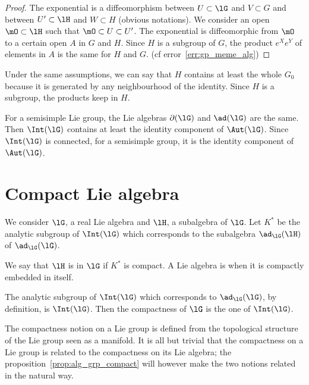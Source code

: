 \begin{proof}
The exponential is a diffeomorphism between $U\subset\lG$ and $V\subset G$ and between $U'\subset\lH$ and $W\subset H$ (obvious notations). We consider an open $\mO\subset\lH$ such that $\mO\subset U\subset U'$. The exponential is diffeomorphic from $\mO$ to a certain open $A$ in $G$ and $H$. Since $H$ is a subgroup of $G$, the product $e^Xe^Y$ of elements in $A$ is the same for $H$ and $G$. (cf error~\ref{err:gp_meme_alg})
\end{proof}

Under the same assumptions, we can say that $H$ contains at least the whole $G_0$ because it is generated by any neighbourhood of the identity. Since $H$ is a subgroup, the products keep in $H$.

For a semisimple Lie group, the Lie algebras $\partial(\lG)$ and $\ad(\lG)$ are the same. Then $\Int(\lG)$ contains at least the identity component of $\Aut(\lG)$. Since $\Int(\lG)$ is connected, for a semisimple group, it is the identity component of $\Aut(\lG)$.

\section{Compact Lie algebra}
\label{pg:compact_Lie}

We consider $\lG$, a real Lie algebra and $\lH$, a subalgebra of $\lG$. Let $K^*$ be the analytic subgroup of $\Int(\lG)$ which corresponds to the subalgebra $\ad_{\lG}(\lH)$ of $\ad_{\lG}(\lG)$.

\begin{definition}      \label{DEFooROMGooTLicyL}
We say that $\lH$ is  in $\lG$ if $K^*$ is compact. A Lie algebra is  when it is compactly embedded in itself.
\end{definition}

The analytic subgroup of $\Int(\lG)$ which corresponds to $\ad_{\lG}(\lG)$, by definition, is $\Int(\lG)$. Then the compactness of $\lG$ is the one of $\Int(\lG)$.

\begin{remark}
The compactness notion on a Lie group is defined from the topological structure of the Lie group seen as a manifold. It is all but trivial that the compactness on a Lie group is related to the compactness on its Lie algebra; the proposition~\ref{prop:alg_grp_compact} will however make the two notions related in the natural way.
\end{remark}

